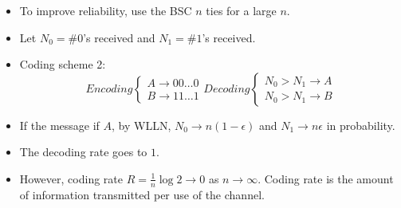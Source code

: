 \documentclass[../main.tex]{subfiles}
\begin{document}
\begin{itemize}
    \item To improve reliability, use the BSC $n$ ties for a large $n$.
    \item Let $N_0=\#0$'s received and $N_1=\#1$'s received.
    \item Coding scheme 2: \[
    Encoding \begin{cases}
        A \to 00\dots 0\\
        B \to 11\dots 1
    \end{cases}
    Decoding \begin{cases}
        N_0 > N_1 \to A\\
        N_0 > N_1 \to B
    \end{cases}
    \] 
    \item If the message if $A$, by WLLN, $N_0\to n(1-\epsilon)$ and $N_1\to n\epsilon$ in probability.
    \item The decoding rate goes to $1$.
    \item However, coding rate $R=\frac{1}{n}\log 2\to 0$ as $n\to \infty$. Coding rate is the amount of information transmitted per use of the channel.
\end{itemize}
\end{document}
